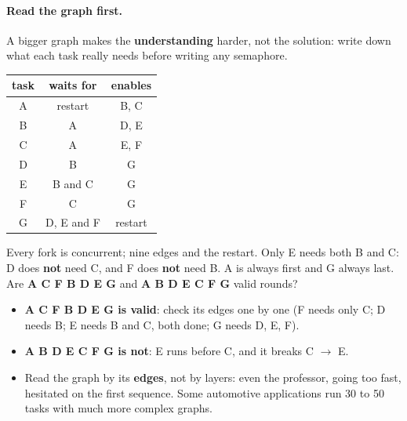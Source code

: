 \paragraph{Read the graph first.} A bigger graph makes the \textbf{understanding} harder, not the solution: write down what each task really needs before writing any semaphore.
\begin{center}
\small
\begin{tabular}{c c c}
    \hline
    \textbf{task} & \textbf{waits for} & \textbf{enables} \\
    \hline
    A & restart & B, C \\
    B & A & D, E \\
    C & A & E, F \\
    D & B & G \\
    E & B and C & G \\
    F & C & G \\
    G & D, E and F & restart \\
    \hline
\end{tabular}
\end{center}
Every fork is concurrent; nine edges and the restart. Only E needs both B and C: D does \textbf{not} need C, and F does \textbf{not} need B. A is always first and G always last. Are \textbf{A C F B D E G} and \textbf{A B D E C F G} valid rounds?
\begin{itemize}
    \item \textbf{A C F B D E G is valid}: check its edges one by one (F needs only C; D needs B; E needs B and C, both done; G needs D, E, F).
    \item \textbf{A B D E C F G is not}: E runs before C, and it breaks C $\rightarrow$ E.
    \item Read the graph by its \textbf{edges}, not by layers: even the professor, going too fast, hesitated on the first sequence. Some automotive applications run 30 to 50 tasks with much more complex graphs.
\end{itemize}

